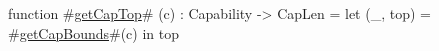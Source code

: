 function #\hyperref[sailMIPSzgetCapTop]{getCapTop}# (c) : Capability -> CapLen =
    let (_, top) = #\hyperref[sailMIPSzgetCapBounds]{getCapBounds}#(c) in
    top
